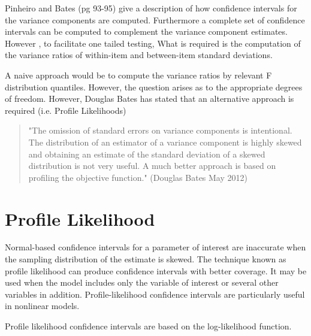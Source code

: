 \documentclass[12pt, a4paper]{report}
\theoremstyle{plain}
\theoremstyle{definition}
\theoremstyle{remark}
\begin{document}
Pinheiro and Bates (pg 93-95) give a description of how confidence intervals for the variance components are computed. Furthermore a complete set of confidence intervals can be computed to complement the variance component estimates.
However , to facilitate one tailed testing, What is required is the computation of the variance ratios of within-item and between-item standard deviations.

A naive approach would be to compute the variance ratios by relevant F distribution quantiles. However, the question arises as to the appropriate degrees of freedom. However, Douglas Bates has stated that an alternative approach is required (i.e. Profile Likelihoods)

\begin{quote}
	"The omission of standard errors on variance components is intentional.
	The distribution of an estimator of a variance component is highly
	skewed and obtaining an estimate of the standard deviation of a skewed
	distribution is not very useful.  A much better approach is based on
	profiling the objective function." (Douglas Bates May 2012)
\end{quote}


\section{Profile Likelihood}
Normal-based confidence intervals for a parameter of interest are inaccurate when the sampling distribution of the estimate is skewed. The technique known as profile likelihood can produce confidence intervals with better coverage. It may be used when the model includes only the variable of interest or several other variables in addition. Profile-likelihood confidence intervals are particularly useful in nonlinear models.

Profile likelihood confidence intervals are based on the log-likelihood function.  

\end{document}
